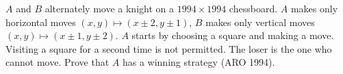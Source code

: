 $A$ and $B$ alternately move a knight on a $1994 \times 1994$ chessboard. $A$ makes only horizontal moves $(x, y) \mapsto (x \pm 2, y \pm 1)$, $B$ makes only vertical moves $(x, y) \mapsto (x \pm 1, y \pm 2)$. $A$ starts by choosing a square and making a move. Visiting a square for a second time is not permitted. The loser is the one who cannot move. Prove that $A$ has a winning strategy (ARO 1994).
